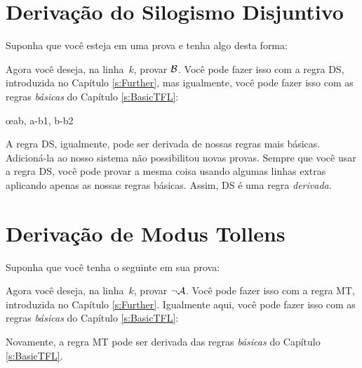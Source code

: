 \section{Deriva\c c\~ao do Silogismo Disjuntivo}
Suponha que voc\^e esteja em uma prova e tenha algo desta forma:
\begin{fitchproof}
\end{fitchproof}
Agora voc\^e deseja, na linha~$k$, provar $\mathcal{B}$. Voc\^e pode fazer isso com a regra DS, introduzida no Capítulo \ref{s:Further}, mas igualmente, voc\^e pode fazer isso com as regras  \emph{b\'asicas} do Capítulo \ref{s:BasicTFL}:
 

	\begin{fitchproof}
		\open
		\close
		\open
		\close
	\oe{ab, a-b1, b-b2}
\end{fitchproof}
A regra DS, igualmente, pode ser derivada de nossas regras mais b\'asicas. Adicion\'a-la ao nosso sistema n\~ao possibilitou novas provas. Sempre  que voc\^e usar a regra DS, voc\^e pode provar a mesma coisa usando algumas linhas extras aplicando apenas as nossas regras b\'asicas. Assim, DS \'e uma regra \emph{derivada}.

\section{Deriva\c c\~ao de Modus Tollens}
Suponha que voc\^e tenha o seguinte em sua prova:
\begin{fitchproof}
\end{fitchproof}
Agora voc\^e deseja, na linha~$k$, provar $\neg \mathcal{A}$. Voc\^e pode fazer isso com a regra  MT, introduzida no Capítulo \ref{s:Further}.  Igualmente aqui, voc\^e pode fazer isso com as regras  \emph{b\'asicas} do Capítulo \ref{s:BasicTFL}:
 
\begin{fitchproof}
		\open
		\close
\end{fitchproof}
Novamente, a regra  MT pode ser derivada das regras  \emph{b\'asicas} do Capítulo \ref{s:BasicTFL}.

